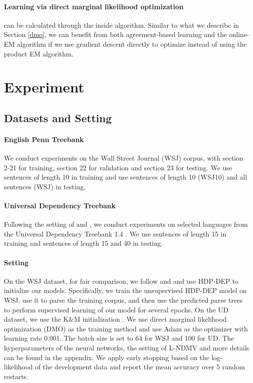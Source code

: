 \documentclass[11pt]{article}
\begin{document}
\paragraph{Learning via direct marginal likelihood optimization}   can be calculated through the inside algorithm. Similar to what we describe in Section \ref{dmo}, we can benefit from both agreement-based learning and the online-EM algorithm if we use gradient descent directly to optimize  instead of using the product EM algorithm.

\section{Experiment}
\subsection{Datasets and Setting}
\paragraph{English Penn Treebank}  We conduct experiments on the Wall Street Journal (WSJ) corpus, with section 2-21 for training, section 22 for validation and section 23 for testing.  We use sentences of length  10 in training and use sentences of length  10 (WSJ10) and all sentences (WSJ) in testing.

\paragraph{Universal Dependency Treebank} Following the setting of  and , we conduct experiments on selected languages from the Universal Dependency Treebank
1.4 \cite{Nivre2016UniversalDV}. We use sentences of length  15 in training and sentences of length  15 and  40 in testing. 

\paragraph{Setting} On the WSJ dataset, for fair comparison, we follow  and  and use HDP-DEP \cite{Naseem2010UsingUL} to initialize our models. Specifically, we train the unsupervised HDP-DEP model on WSJ, use it to parse the training corpus, and then use the predicted parse trees to perform supervised learning of our model for several epochs. On the UD dataset, we use the K\&M initialization \cite{Klein2004CorpusBasedIO}.
We use direct marginal likelihood optimization (DMO) as the training method and use Adam \cite{Kingma2015AdamAM} as the optimizer with learning rate 0.001. The batch size is set to 64 for WSJ and 100 for UD.
The hyperparameters of the neural networks, the setting of L-NDMV and more details can be found in the appendix. We apply early stopping based on the log-likelihood of the development data and report the mean accuracy over 5 random restarts. 
\end{document}
